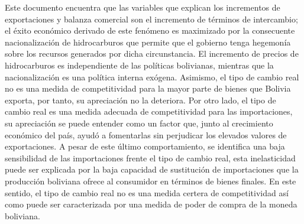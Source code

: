 \documentclass[12pt,letterpaper]{article}
\begin{document}
Este documento encuentra que las variables que explican los incrementos de exportaciones y balanza comercial son el incremento de términos de intercambio; el éxito económico derivado de este fenómeno es maximizado por la consecuente nacionalización de hidrocarburos que permite que el gobierno tenga hegemonía sobre los recursos generados por dicha circunstancia. El incremento de precios de hidrocarburos es independiente de las políticas bolivianas, mientras que la nacionalización es una política interna exógena. Asimismo, el tipo de cambio real no es una medida de competitividad para la mayor parte de bienes que Bolivia exporta, por tanto, su apreciación no la deteriora. Por otro lado, el tipo de cambio real es una medida adecuada de competitividad para las importaciones, su apreciación se puede entender como un factor que, junto al crecimiento económico del país, ayudó a fomentarlas sin perjudicar los elevados valores de exportaciones. A pesar de este último comportamiento, se identifica una baja sensibilidad de las importaciones frente el tipo de cambio real, esta inelasticidad puede ser explicada por la baja capacidad de sustitución de importaciones que la producción boliviana ofrece al consumidor en términos de bienes finales. En este sentido, el tipo de cambio real no es una medida certera de competitividad así como puede ser caracterizada por una medida de poder de compra de la moneda boliviana.


\end{document}
